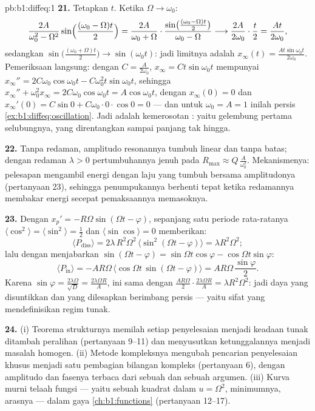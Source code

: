 \begin{solution}{pb:b1:diffeq:1}
\textbf{21.} Tetapkan $t$. Ketika $\Omega \to \omega_0$:
\[
\frac{2A}{\omega_0^2 - \Omega^2}\sin\Bigl(\frac{(\omega_0 -
\Omega)t}2\Bigr)
= \frac{2A}{\omega_0 + \Omega}\cdot
\frac{\sin\bigl(\frac{(\omega_0 - \Omega)t}2\bigr)}
{\omega_0 - \Omega}
\longrightarrow \frac{2A}{2\omega_0}\cdot\frac t2
= \frac{At}{2\omega_0} ,
\]
sedangkan $\sin\bigl(\frac{(\omega_0 + \Omega)t}2\bigr) \to
\sin(\omega_0 t)$: jadi limitnya adalah $x_\infty(t) =
\frac{At\sin\omega_0 t}{2\omega_0}$. Pemeriksaan langsung: dengan $C =
\frac A{2\omega_0}$, $x_\infty = Ct\sin\omega_0 t$ mempunyai
$x_\infty'' = 2C\omega_0\cos\omega_0 t - C\omega_0^2 t
\sin\omega_0 t$, sehingga $x_\infty'' + \omega_0^2 x_\infty =
2C\omega_0\cos\omega_0 t = A\cos\omega_0 t$, dengan $x_\infty(0) =
0$ dan $x_\infty'(0) = C\sin 0 + C\omega_0 \cdot 0 \cdot \cos 0 =
0$ --- dan untuk $\omega_0 = A = 1$ inilah
persis \cref{ex:b1:diffeq:oscillation}. Jadi  adalah
kemerosotan : yaitu gelembung pertama selubungnya, yang direntangkan
sampai panjang tak hingga.

\textbf{22.} Tanpa redaman, amplitudo resonannya tumbuh linear
dan tanpa batas; dengan redaman $\lambda > 0$ pertumbuhannya jenuh
pada $R_{\max} \approx Q\,\frac A{\omega_0^2}$. Mekanismenya:
pelesapan mengambil energi dengan laju yang tumbuh bersama amplitudonya
(pertanyaan 23), sehingga penumpukannya berhenti tepat ketika redamannya
membakar energi secepat pemaksaannya memasoknya.

\textbf{23.} Dengan $x_p' = -R\Omega\sin(\Omega t - \varphi)$, sepanjang
satu periode rata-ratanya $\langle\cos^2\rangle =
\langle\sin^2\rangle = \frac12$ dan $\langle\sin\cos\rangle = 0$
memberikan:
\[
\langle P_{\mathrm{diss}}\rangle
= 2\lambda\,R^2\Omega^2\,\langle\sin^2(\Omega t -
\varphi)\rangle = \lambda R^2\Omega^2 ;
\]
lalu dengan menjabarkan $\sin(\Omega t - \varphi) = \sin\Omega t\cos\varphi
- \cos\Omega t\sin\varphi$:
\[
\langle P_{\mathrm{in}}\rangle
= -AR\Omega\,\bigl\langle\cos\Omega t\,\sin(\Omega t -
\varphi)\bigr\rangle
= AR\Omega\,\frac{\sin\varphi}2 .
\]
Karena $\sin\varphi = \frac{2\lambda\Omega}{\sqrt D} =
\frac{2\lambda\Omega R}A$, ini sama dengan $\frac{AR\Omega}2 \cdot
\frac{2\lambda\Omega R}A = \lambda R^2\Omega^2$: jadi daya yang disuntikkan dan
yang dilesapkan berimbang persis --- yaitu sifat yang mendefinisikan
regim tunak.

\textbf{24.} (i) Teorema strukturnya memilah setiap penyelesaian menjadi
keadaan tunak ditambah peralihan (pertanyaan 9--11) dan menyusutkan
ketunggalannya menjadi masalah homogen. (ii) Metode kompleksnya
mengubah pencarian penyelesaian khusus menjadi satu pembagian
bilangan kompleks (pertanyaan 6), dengan amplitudo dan fasenya terbaca dari
sebuah  dan sebuah argumen. (iii) Kurva  murni
telaah fungsi --- yaitu sebuah kuadrat dalam $u = \Omega^2$, minimumnya,
 arasnya --- dalam gaya \cref{ch:b1:functions}
(pertanyaan 12--17).


\end{solution}
